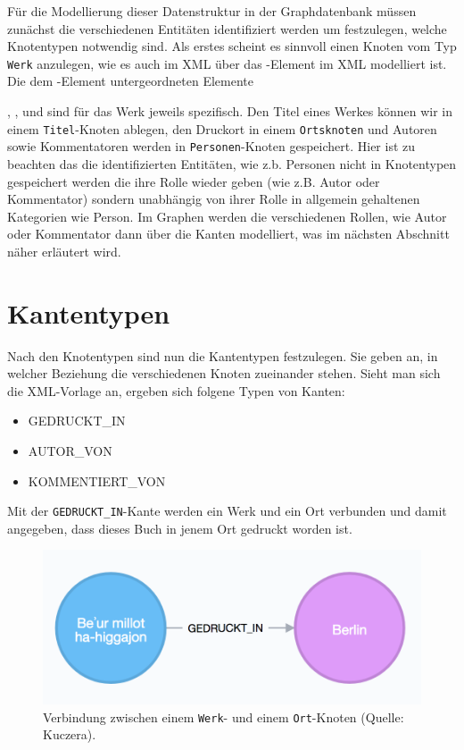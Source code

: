 \documentclass[ngerman,]{scrreprt}
\providecommand{\tightlist}{%
  \setlength{\itemsep}{0pt}\setlength{\parskip}{0pt}}
\begin{document}
Für die Modellierung dieser Datenstruktur in der Graphdatenbank müssen zunächst die verschiedenen Entitäten identifiziert werden um festzulegen, welche Knotentypen notwendig sind. Als erstes scheint es sinnvoll einen Knoten vom Typ \texttt{Werk} anzulegen, wie es auch im XML über das -Element im XML modelliert ist. Die dem -Element untergeordneten Elemente

, , und sind für das Werk jeweils spezifisch. Den Titel eines Werkes können wir in einem \texttt{Titel}-Knoten ablegen, den Druckort in einem \texttt{Ortsknoten} und Autoren sowie Kommentatoren werden in \texttt{Personen}-Knoten gespeichert. Hier ist zu beachten das die identifizierten Entitäten, wie z.b. Personen nicht in Knotentypen gespeichert werden die ihre Rolle wieder geben (wie z.B. Autor oder Kommentator) sondern unabhängig von ihrer Rolle in allgemein gehaltenen Kategorien wie Person. Im Graphen werden die verschiedenen Rollen, wie Autor oder Kommentator dann über die Kanten modelliert, was im nächsten Abschnitt näher erläutert wird.

\section{Kantentypen}\label{kantentypen}

Nach den Knotentypen sind nun die Kantentypen festzulegen. Sie geben an, in welcher Beziehung die verschiedenen Knoten zueinander stehen. Sieht man sich die XML-Vorlage an, ergeben sich folgene Typen von Kanten:

\begin{itemize}
\tightlist
\item
  GEDRUCKT\_IN
\item
  AUTOR\_VON
\item
  KOMMENTIERT\_VON
\end{itemize}

Mit der \texttt{GEDRUCKT\_IN}-Kante werden ein Werk und ein Ort verbunden und damit angegeben, dass dieses Buch in jenem Ort gedruckt worden ist.

\begin{figure}
\centering
\includegraphics{Bilder/Werk-Ort.png}
\caption{Verbindung zwischen einem \texttt{Werk}- und einem \texttt{Ort}-Knoten (Quelle: Kuczera).}
\end{figure}
\end{document}
